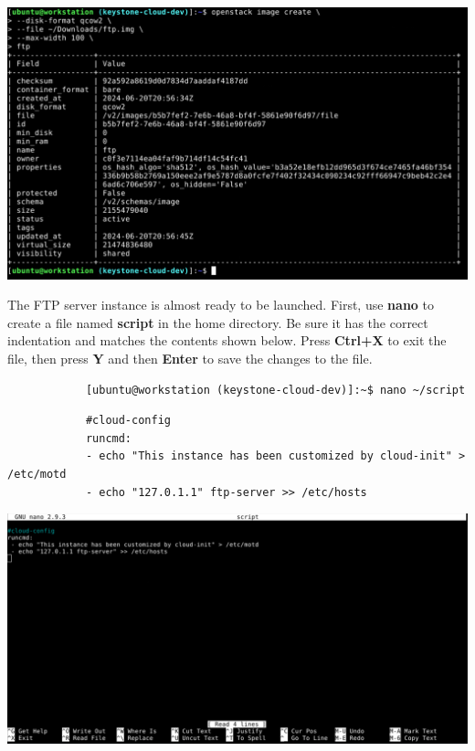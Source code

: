 \documentclass[letterpaper, 12pt]{article}
\begin{document}
\begin{enumerate}
\begin{labstep}
        \begin{center}
            \includegraphics[width=\linewidth]{images/part1/step36.png}
        \end{center}
    \end{labstep}

    \begin{labstep}
        The FTP server instance is almost ready to be launched.
        First, use \textbf{nano} to create a file named \textbf{script} in the home directory.
        Be sure it has the correct indentation and matches the contents shown below.
        Press \textbf{Ctrl+X} to exit the file, then press \textbf{Y} and then \textbf{Enter} to save the changes to the file.
        \begin{lstlisting}
            [ubuntu@workstation (keystone-cloud-dev)]:~$ nano ~/script
        \end{lstlisting}
        \begin{lstlisting}
            #cloud-config
            runcmd:
            - echo "This instance has been customized by cloud-init" > /etc/motd
            - echo "127.0.1.1" ftp-server >> /etc/hosts
        \end{lstlisting}

        \begin{center}
            \includegraphics[width=\linewidth]{images/part1/step37.png}
        \end{center}
    \end{labstep}


\end{enumerate}
\end{document}
